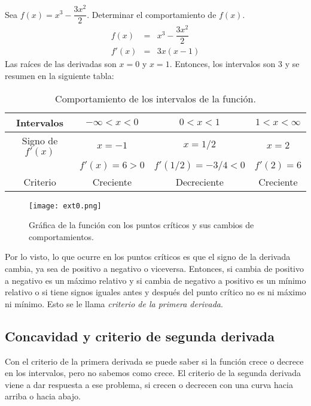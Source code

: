 \begin{myexample}
Sea $f(x)=x^{3}-\dfrac{3x^{2}}{2}$. Determinar el comportamiento de $f(x)$.
\begin{eqnarray*}
f(x)&=& x^{3}-\dfrac{3x^{2}}{2}\\
f'(x)&=&3x(x-1)
\end{eqnarray*}
Las raíces de las derivadas son $x=0$ y $x=1$. Entonces, los intervalos son 3 y se resumen en la siguiente tabla:
\begin{table}[h!]
\begin{center}
		\begin{tabular}{|c|c|c|c|}
		\hline
		Intervalos & $-\infty <x<0$   & $0<x<1$&$1<x<\infty$ \\ 
		\hline
		 Signo de $f'(x)$&$x=-1$ &$x=1/2$ &$x=2$   \\
		 & $f'(x)=6>0$  & $f'(1/2)=-3/4<0$&$f'(2)=6$  \\
		\hline
		Criterio &Creciente&Decreciente& Creciente \\
		\hline
		\end{tabular}
		\caption{Comportamiento de los intervalos de la función.}
\end{center}
\end{table}
 \begin{center}
\begin{figure}[h!]
\centering
\texttt{[image: ext0.png]}
\caption{Gráfica de la función con los puntos críticos y sus cambios de comportamientos.} \label{ext0}
\end{figure}
\end{center}
\end{myexample}

Por lo visto, lo que ocurre en los puntos críticos es que el signo de la derivada cambia, ya sea de positivo a negativo  o viceversa. Entonces, si cambia de positivo a negativo es un máximo relativo y si cambia de negativo a positivo es un mínimo relativo o si tiene signos iguales antes y después del punto crítico no es ni máximo ni mínimo. Esto se le llama \textit{criterio de la primera derivada}.

\subsection{Concavidad y criterio de segunda derivada}

Con el criterio de la primera derivada se puede saber si la función crece o decrece en los intervalos, pero no sabemos como crece. El criterio de la segunda derivada viene a dar respuesta a ese problema, si crecen o decrecen con una curva hacia arriba o hacia abajo.

